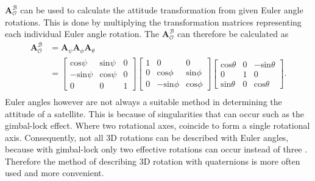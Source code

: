 $\boldsymbol{A}^{\mathcal{B}}_{\mathcal{O}}$ can be used to calculate the attitude transformation from given Euler angle rotations. This is done by multiplying the transformation matrices representing each individual Euler angle rotation. The $\boldsymbol{A}^{\mathcal{B}}_{\mathcal{O}}$ can therefore be calculated as 
\begin{equation}
	\begin{aligned}
		\boldsymbol{A}^{\mathcal{B}}_{\mathcal{O}} &= \boldsymbol{A}_{\psi} \boldsymbol{A}_{\phi} \boldsymbol{A}_{\theta} \\
			&= \begin{bmatrix}
			\text{cos} \psi & \text{sin} \psi & 0 \\
			-\text{sin} \psi & \text{cos} \psi & 0 \\
			0 & 0 & 1
			\end{bmatrix} \begin{bmatrix}
			1 & 0 & 0 \\
			0 & \text{cos} \phi & \text{sin} \phi \\
			0 & -\text{sin} \phi & \text{cos} \phi
			\end{bmatrix} \begin{bmatrix}
			\text{cos} \theta &  0 & -\text{sin} \theta \\
			0 & 1 & 0 \\
			\text{sin} \theta & 0 & \text{cos} \theta
			\end{bmatrix}. \\
	\end{aligned}
\end{equation}
Euler angles however are not always a suitable method in determining the attitude of a satellite. This is because of singularities that can occur such as the gimbal-lock effect. Where two rotational axes, coincide to form a single rotational axis. Consequently, not all $3$D rotations can be described with Euler angles, because with gimbal-lock only two effective rotations can occur instead of three \cite{diebel2006representing}. Therefore the method of describing $3$D rotation with quaternions is more often used and more convenient. 

